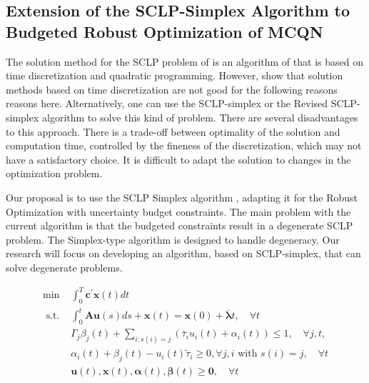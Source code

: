 \documentclass[11pt,a4paper,titlepage]{article}
\theoremstyle{definition}
\theoremstyle{plain}
\begin{document}
\subsection{Extension of the SCLP-Simplex Algorithm to Budgeted Robust Optimization of MCQN}
\label{subsec:topics:robust-sclp-extension}


The solution method for the SCLP problem of \autocite{bertsimas2014robust}
is an algorithm of \autocite{luo1998new}
that is based on time discretization and quadratic programming.
However,
\autocite{shindin2021application} show that solution methods based on time discretization are not good for the following reasons {reasons here}.
Alternatively, one can use the SCLP-simplex \autocite{weiss2008simplex}
or the Revised SCLP-simplex \autocite{shindin2021application}
algorithm to solve this kind of problem.
There are several disadvantages to this approach.
There is a trade-off between optimality of the solution and computation time,
controlled by the fineness of the discretization,
which may not have a satisfactory choice.
It is difficult to adapt the solution to changes in the optimization problem.

Our proposal is to use the SCLP Simplex algorithm \autocite{weiss2008simplex,shindin2021application},
adapting it for the Robust Optimization with uncertainty budget constraints.
The main problem with the current algorithm is that the budgeted constraints result in a
degenerate SCLP problem.
The Simplex-type algorithm is designed to handle degeneracy.
Our research will focus on developing an algorithm,
based on SCLP-simplex,
that can solve degenerate problems.

\begin{align}
    \min & \int_{0}^{T} \mathbf{c}^{\prime} \mathbf{x}(t) d t \\
    \text { s.t. } & \int_{0}^{t} \mathbf{A} \mathbf{u}(s) d s+\mathbf{x}(t)=\mathbf{x}(0)+\overline{\boldsymbol{\lambda}} t, \quad \forall t \\
    & \Gamma_{j} \beta_{j}(t)+\sum_{i: s(i)=j}\left(\bar{\tau}_{i} u_{i}(t)+\alpha_{i}(t)\right) \leq 1, \quad \forall j, t, \\
    & \alpha_{i}(t)+\beta_{j}(t)-u_{i}(t) \tilde{\tau}_{i} \geq 0, \forall j, i \text { with } s(i)=j, \quad \forall t \label{eq:robust-sclp-mcqn-budgeted} \\
    & \mathbf{u}(t), \mathbf{x}(t), \boldsymbol{\alpha}(t), \boldsymbol{\beta}(t) \geq \mathbf{0}, \quad \forall t
\end{align}
\end{document}
